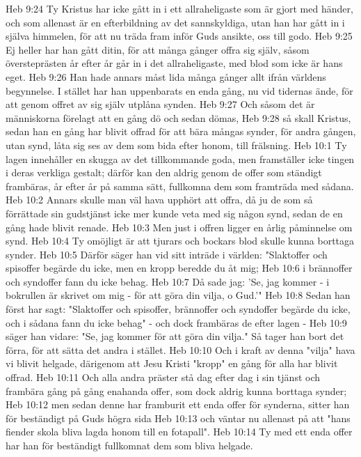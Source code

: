 Heb 9:24  Ty Kristus har icke gått in i ett allraheligaste som är gjort med händer, och som allenast är en efterbildning av det sannskyldiga, utan han har gått in i själva himmelen, för att nu träda fram inför Guds ansikte, oss till godo.
Heb 9:25  Ej heller har han gått ditin, för att många gånger offra sig själv, såsom översteprästen år efter år går in i det allraheligaste, med blod som icke är hans eget.
Heb 9:26  Han hade annars måst lida många gånger allt ifrån världens begynnelse. I stället har han uppenbarats en enda gång, nu vid tidernas ände, för att genom offret av sig själv utplåna synden.
Heb 9:27  Och såsom det är människorna förelagt att en gång dö och sedan dömas,
Heb 9:28  så skall Kristus, sedan han en gång har blivit offrad för att bära mångas synder, för andra gången, utan synd, låta sig ses av dem som bida efter honom, till frälsning.
Heb 10:1  Ty lagen innehåller en skugga av det tillkommande goda, men framställer icke tingen i deras verkliga gestalt; därför kan den aldrig genom de offer som ständigt frambäras, år efter år på samma sätt, fullkomna dem som framträda med sådana.
Heb 10:2  Annars skulle man väl hava upphört att offra, då ju de som så förrättade sin gudstjänst icke mer kunde veta med sig någon synd, sedan de en gång hade blivit renade.
Heb 10:3  Men just i offren ligger en årlig påminnelse om synd.
Heb 10:4  Ty omöjligt är att tjurars och bockars blod skulle kunna borttaga synder.
Heb 10:5  Därför säger han vid sitt inträde i världen: "Slaktoffer och spisoffer begärde du icke, men en kropp beredde du åt mig;
Heb 10:6  i brännoffer och syndoffer fann du icke behag.
Heb 10:7  Då sade jag: 'Se, jag kommer - i bokrullen är skrivet om mig - för att göra din vilja, o Gud.'"
Heb 10:8  Sedan han först har sagt: "Slaktoffer och spisoffer, brännoffer och syndoffer begärde du icke, och i sådana fann du icke behag" - och dock frambäras de efter lagen -
Heb 10:9  säger han vidare: "Se, jag kommer för att göra din vilja." Så tager han bort det förra, för att sätta det andra i stället.
Heb 10:10  Och i kraft av denna "vilja" hava vi blivit helgade, därigenom att Jesu Kristi "kropp" en gång för alla har blivit offrad.
Heb 10:11  Och alla andra präster stå dag efter dag i sin tjänst och frambära gång på gång enahanda offer, som dock aldrig kunna borttaga synder;
Heb 10:12  men sedan denne har framburit ett enda offer för synderna, sitter han för beständigt på Guds högra sida
Heb 10:13  och väntar nu allenast på att "hans fiender skola bliva lagda honom till en fotapall".
Heb 10:14  Ty med ett enda offer har han för beständigt fullkomnat dem som bliva helgade.
